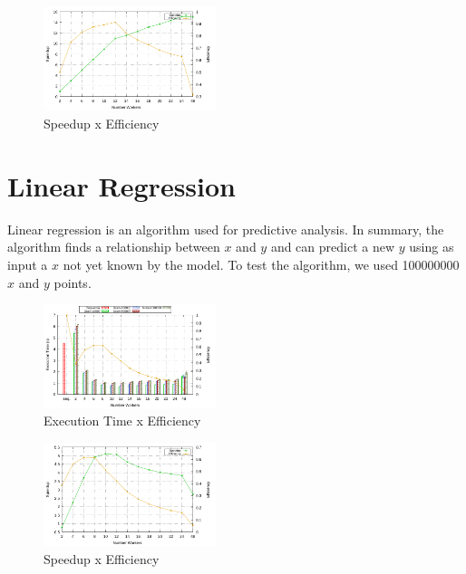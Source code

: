\documentclass[10pt, twocolumn]{report}
\begin{document}
\begin{figure}[h]
	\centering
	\includegraphics[width=0.45\textwidth]{../logs/scripts/bubble-sort-speedup-efficiency.pdf}
	\caption{Speedup x Efficiency}
	\label{fig:bubble-sort-speedup-efficiency}
\end{figure}

\section {Linear Regression}
Linear regression is an algorithm used for predictive analysis. In summary, the algorithm finds a relationship between $x$ and $y$ and can predict a new $y$ using as input a $x$ not yet known by the model. To test the algorithm, we used 100000000 $x$ and $y$ points.

\begin{figure}[h]
	\centering
	\includegraphics[width=0.45\textwidth]{../logs/scripts/linear-regression-time.pdf}
	\caption{Execution Time x Efficiency}
	\label{fig:linear-regression-time}
\end{figure}

\begin{figure}[h]
	\centering
	\includegraphics[width=0.45\textwidth]{../logs/scripts/linear-regression-speedup-efficiency.pdf}
	\caption{Speedup x Efficiency}
	\label{fig:linear-regression-speedup-efficiency}
\end{figure}
\end{document}
